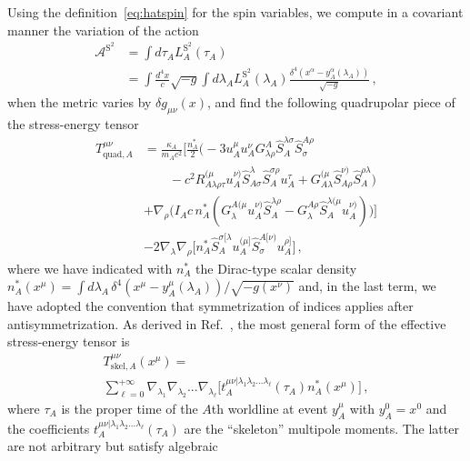 \documentclass[aps, prd,
twocolumn,%
superscriptaddress,
showpacs, nofootinbib, eqsecnum, amsmath, amssymb, floatfix
]{revtex4}
\begin{document}
Using the definition~\eqref{eq:hatspin} for the spin variables, we compute in a
covariant manner the variation of the action
%
\begin{align}
\mathcal{A}^{\text{S}^2} &=
\int d\tau_A L_A^{\text{S}^2}(\tau_A) \nonumber \\ &= \int \frac{d^4
x}{c} \sqrt{-g} \int d\lambda_A L_A^{\text{S}^2}(\lambda_A) \frac{\delta^4(x^\alpha -
y^\alpha_A(\lambda_A))}{\sqrt{-g}} \, ,
\end{align}
%
when the metric varies by $\delta g_{\mu\nu}(x)$, and find the following
quadrupolar piece of the stress-energy tensor
%
\begin{align} \label{eq:TSSA}
T^{\mu\nu}_{\text{quad},A} & =  \frac{\kappa_A}{m_A c^2} \Big[ \frac{n^*_A}{2}
\Big(-3 u_A^\mu u^\nu_A G^A_{\lambda \rho} \hat{S}^{\lambda \sigma}_A
\hat{S}_\sigma^{A\rho}\nonumber  \\ & \qquad -  c^2 R^{(\mu}_{A\lambda\rho \tau} u_A^{\nu)}
\hat{S}^\lambda_{A\sigma} \hat{S}_A^{\sigma \rho} u_A^\tau + G^{(\mu}_{A\lambda}
\hat{S}^{\nu)}_{A\rho} \hat{S}_A^{\rho \lambda} \Big) \nonumber \\ & + \nabla_\rho
\Big( I_A c\, n_A^* (G^{A(\mu}_\lambda u_A^{\nu)} \hat{S}_A^{\lambda \rho} -
G_\lambda^{A\rho} \hat{S}^{\lambda(\mu}_A u_A^{\nu)} ) \Big) \Big] \nonumber
\\ & -2 \nabla_\lambda \nabla_\rho
\Big[ n^*_A \hat{S}_A^{\sigma [\lambda} u_A^{(\mu]} \hat{S}_{\sigma}^{A[\nu)}
u_A^{\rho]} \Big] \, ,
\end{align}
%
where we have indicated with $n^*_A$ the Dirac-type scalar density
$n^*_A(x^\mu) = \int d\lambda_A \, \delta^4(x^\mu-
y_A^\mu(\lambda_A))/\sqrt{-g(x^\nu)}$ and, in the last term, we have adopted
the convention that
symmetrization of indices applies after antisymmetrization.
As derived in Ref.~\cite{Tulczyjew1959}, the most general form of the
effective stress-energy tensor is
%
\begin{multline}
T^{\mu\nu}_{\text{skel} , A}(x^\mu) = \\\sum_{\ell = 0}^{+\infty}
\nabla_{\lambda_1} \nabla_{\lambda_2} ... \nabla_{\lambda_\ell}
\Big[t_A^{\mu\nu
  | \lambda_1 \lambda_2 ...  \lambda_\ell}(\tau_A) n^*_A(x^\mu) \Big] \, ,
\label{skeletonTmunu}
\end{multline}
where $\tau_A$ is the proper time of the $A$th worldline at event
$y_A^\mu$ with $y_A^0 = x^0$ and the coefficients $t^{\mu\nu |
\lambda_1
  \lambda_2 ... \lambda_\ell}_A(\tau_A)$ are the ``skeleton'' multipole
moments. The latter are not arbitrary but satisfy algebraic
\end{document}
